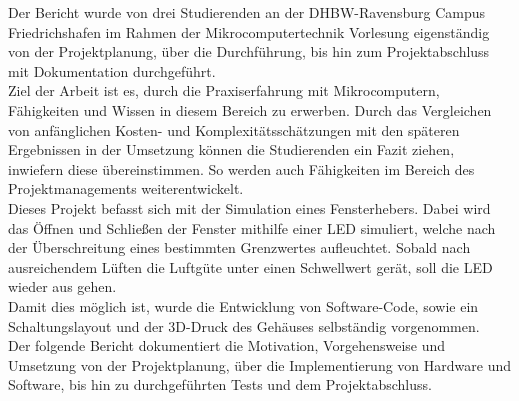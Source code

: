 
\label{kurzfassung}

Der Bericht wurde von drei Studierenden an der \ac{DHBW}-Ravensburg Campus Friedrichshafen im Rahmen der Mikrocomputertechnik Vorlesung eigenständig von der Projektplanung, über die Durchführung, bis hin zum Projektabschluss mit Dokumentation durchgeführt. \\
Ziel der Arbeit ist es, durch die Praxiserfahrung mit Mikrocomputern, Fähigkeiten und Wissen in diesem Bereich zu erwerben. Durch das Vergleichen von anfänglichen Kosten- und Komplexitätsschätzungen mit den späteren Ergebnissen in der Umsetzung können die Studierenden ein Fazit ziehen, inwiefern diese übereinstimmen. So werden auch Fähigkeiten im Bereich des Projektmanagements weiterentwickelt. \\
Dieses Projekt befasst sich mit der Simulation eines Fensterhebers. Dabei wird das Öffnen und Schließen der Fenster mithilfe einer \ac{LED} simuliert, welche nach der Überschreitung eines bestimmten Grenzwertes aufleuchtet. Sobald nach ausreichendem Lüften die Luftgüte unter einen Schwellwert gerät, soll die \ac{LED} wieder aus gehen. \\
Damit dies möglich ist, wurde die Entwicklung von Software-Code, sowie ein Schaltungslayout und der 3D-Druck des Gehäuses selbständig vorgenommen. \\
Der folgende Bericht dokumentiert die Motivation, Vorgehensweise und Umsetzung von der Projektplanung, über die Implementierung von Hardware und Software, bis hin zu durchgeführten Tests und dem Projektabschluss.